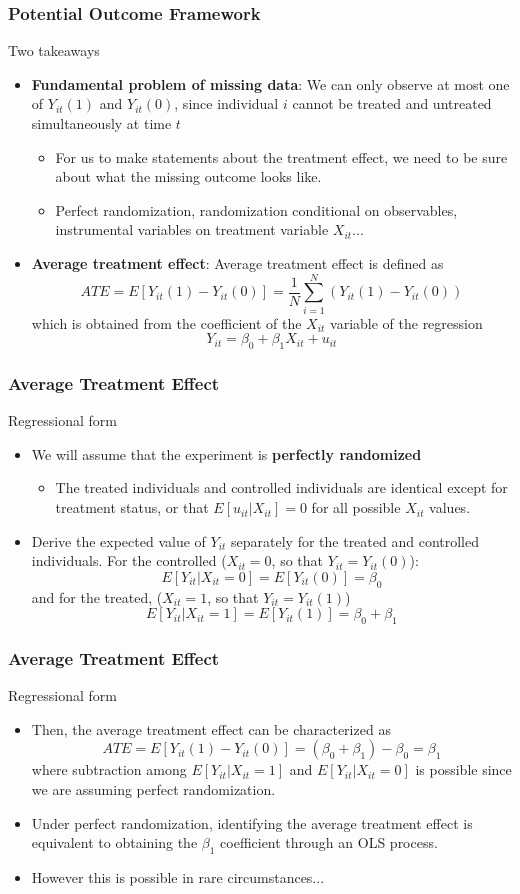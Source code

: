 \documentclass[aspectratio=169]{beamer}
\begin{document}
\begin{frame}
\frametitle{Potential Outcome Framework}
Two takeaways
\begin{itemize}
\item \textbf{Fundamental problem of missing data}: We can only observe at most one of $Y_{it}(1)$ and $Y_{it}(0)$, since individual $i$ cannot be treated and untreated simultaneously at time $t$
\begin{itemize}
\item For us to make statements about the treatment effect, we need to be sure about what the missing outcome looks like. 
\item Perfect randomization, randomization conditional on observables, instrumental variables on treatment variable $X_{it}$...
\end{itemize}
\item \textbf{Average treatment effect}: Average treatment effect is defined as
\small{\[
ATE = E[Y_{it}(1)-Y_{it}(0)]=\frac{1}{N}\sum_{i=1}^N(Y_{it}(1)-Y_{it}(0))
\]}\normalsize
which is obtained from the coefficient of the $X_{it}$ variable of the regression
\[
Y_{it}=\beta_0+\beta_1X_{it}+u_{it}
\]
\end{itemize}
\end{frame}

\begin{frame}
\frametitle{Average Treatment Effect}
Regressional form
\begin{itemize}
\item We will assume that the experiment is \textbf{perfectly randomized} 
\begin{itemize}
\item The treated individuals and controlled individuals are identical except for treatment status, or that $E[u_{it}|X_{it}]=0$ for all possible $X_{it}$ values. 
\end{itemize}
\item Derive the expected value of $Y_{it}$ separately for the treated and controlled individuals. For the controlled ($X_{it}=0$, so that $Y_{it}=Y_{it}(0)$):
\[
E[Y_{it}|X_{it}=0]=E[Y_{it}(0)]=\beta_0
\]
and for the treated, ($X_{it}=1$, so that $Y_{it}=Y_{it}(1)$)
\[
E[Y_{it}|X_{it}=1]=E[Y_{it}(1)]=\beta_0+\beta_1
\]
\end{itemize}
\end{frame}

\begin{frame}
\frametitle{Average Treatment Effect}
Regressional form
\begin{itemize}
\item Then, the average treatment effect can be characterized as
\[
ATE = E[Y_{it}(1)-Y_{it}(0)]=(\beta_0+\beta_1)-\beta_0=\beta_1
\]
where subtraction among $E[Y_{it}|X_{it}=1]$ and $E[Y_{it}|X_{it}=0]$ is possible since we are assuming perfect randomization.
\item Under perfect randomization, identifying the average treatment effect is equivalent to obtaining the $\beta_1$ coefficient through an OLS process.
\item However this is possible in rare circumstances...
\end{itemize}
\end{frame}
\end{document}
